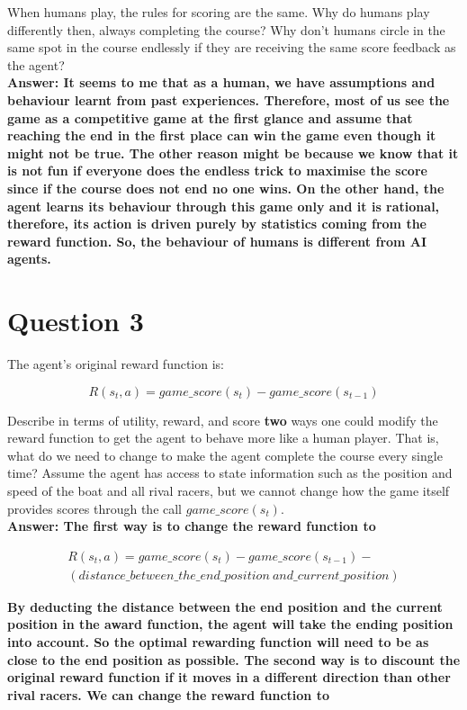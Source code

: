 \documentclass[12pt]{extarticle}
\begin{document}
When humans play, the rules for scoring are the same. Why do humans play differently then, always completing the course? Why don’t humans circle in the same spot in the course endlessly if they are receiving the same score feedback as the agent? \\

\noindent\textbf{Answer: It seems to me that as a human, we have assumptions and behaviour learnt from past experiences. Therefore, most of us see the game as a competitive game at the first glance and assume that reaching the end in the first place can win the game even though it might not be true. The other reason might be because we know that it is not fun if everyone does the endless trick to maximise the score since if the course does not end no one wins. On the other hand, the agent learns its behaviour through this game only and it is rational, therefore, its action is driven purely by statistics coming from the reward function. So, the behaviour of humans is different from AI agents.
} 

\newpage
\section*{Question 3}

The agent’s original reward function is:

$$R(s_t, a) = game\_score(s_t) - game\_score(s_{t-1})$$

\noindent Describe in terms of utility, reward, and score \textbf{two} ways one could modify the reward function to get the agent to behave more like a human player. That is, what do we need to change to make the agent complete the course every single time? Assume the agent has access to state information such as the position and speed of the boat and all rival racers, but we cannot change how the game itself provides scores through the call $game\_score(s_t)$. \\

\noindent\textbf{Answer: The first way is to change the reward function to}

\begin{equation}
\begin{split}
R(s_t, a) = game\_score(s_t) - game\_score(s_{t-1}) - \\(distance\_between\_the\_end\_position\ and\_current\_position)
\end{split}
\end{equation}

\noindent\textbf{By deducting the distance between the end position and the current position in the award function, the agent will take the ending position into account. So the optimal rewarding function will need to be as close to the end position as possible. The second way is to discount the original reward function if it moves in a different direction than other rival racers. We can change the reward function to}
\end{document}
